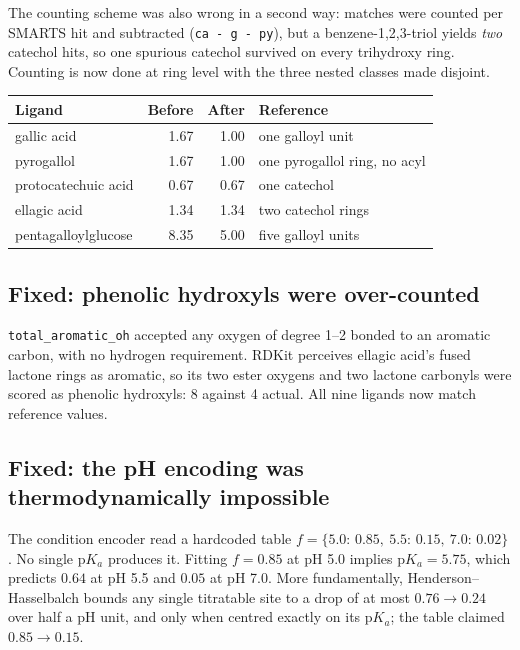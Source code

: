 \documentclass[11pt,a4paper]{article}
\newcommand{\ok}[1]{\textcolor{okgreen}{#1}}
\newcommand{\bad}[1]{\textcolor{badred}{#1}}
\newcommand{\code}[1]{\texttt{\small #1}}
\begin{document}
The counting scheme was also wrong in a second way: matches were counted per
SMARTS hit and subtracted (\code{ca - g - py}), but a benzene-1,2,3-triol
yields \emph{two} catechol hits, so one spurious catechol survived on every
trihydroxy ring. Counting is now done at ring level with the three nested
classes made disjoint.

\begin{center}
\begin{tabular}{@{}lrrl@{}}
\toprule
\textbf{Ligand} & \textbf{Before} & \textbf{After} & \textbf{Reference} \\
\midrule
gallic acid          & 1.67 & \ok{1.00} & one galloyl unit \\
pyrogallol           & 1.67 & \ok{1.00} & one pyrogallol ring, no acyl \\
protocatechuic acid  & 0.67 & \ok{0.67} & one catechol \\
ellagic acid         & 1.34 & \ok{1.34} & two catechol rings \\
pentagalloylglucose  & 8.35 & \ok{5.00} & five galloyl units \\
\bottomrule
\end{tabular}
\end{center}

\subsection{Fixed: phenolic hydroxyls were over-counted}

\code{total\_aromatic\_oh} accepted any oxygen of degree 1--2 bonded to an
aromatic carbon, with no hydrogen requirement. RDKit perceives ellagic acid's
fused lactone rings as aromatic, so its two ester oxygens and two lactone
carbonyls were scored as phenolic hydroxyls: \bad{8 against 4 actual}. All
nine ligands now match reference values.

\subsection{Fixed: the pH encoding was thermodynamically impossible}

The condition encoder read a hardcoded table
$f = \{5.0{:}\,0.85,\ 5.5{:}\,0.15,\ 7.0{:}\,0.02\}$. No single p$K_a$
produces it. Fitting $f = 0.85$ at pH 5.0 implies $\mathrm{p}K_a = 5.75$,
which predicts $0.64$ at pH 5.5 and $0.05$ at pH 7.0. More fundamentally,
Henderson--Hasselbalch bounds any single titratable site to a drop of at most
$0.76 \to 0.24$ over half a pH unit, and only when centred exactly on its
p$K_a$; the table claimed $0.85 \to 0.15$.
\end{document}
